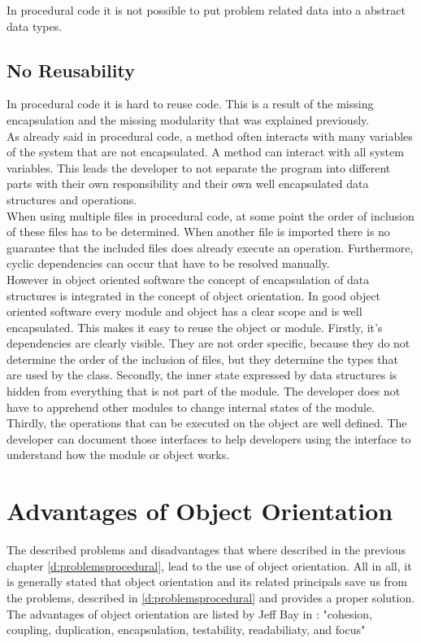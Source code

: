 In procedural code it is not possible to put problem related data into a abstract data types.

\subsection*{No Reusability}
In procedural code it is hard to reuse code. This is a result of the missing encapsulation and the missing modularity that was explained previously.\\

As already said in procedural code, a method often interacts with many variables of the system that are not encapsulated. A method can interact with all system variables. This leads the developer to not separate the program into different parts with their own responsibility and their own well encapsulated data structures and operations. \\

When using multiple files in procedural code, at some point the order of inclusion of these files has to be determined. When another file is imported there is no guarantee that the included files does already execute an operation. Furthermore, cyclic dependencies can occur that have to be resolved manually. \\

However in object oriented software the concept of encapsulation of data structures is integrated in the concept of object orientation.  In good object oriented software every module and object has a clear scope and is well encapsulated. This makes it easy to reuse the object or module. Firstly, it's dependencies are clearly visible. They are not order specific, because they do not determine the order of the inclusion of files, but they determine the types that are used by the class. Secondly, the inner state expressed by data structures is hidden from everything that is not part of the module. The developer does not have to apprehend other modules to change internal states of the module. Thirdly, the operations that can be executed on the object are well defined. The developer can document those interfaces to help developers using the interface to understand how the module or object works.

\section{Advantages of Object Orientation}
The described problems and disadvantages that where described in the previous chapter \ref{d:problemsprocedural}, lead to the use of object orientation. 
All in all, it is generally stated that object orientation and its related principals save us from the problems, described in \ref{d:problemsprocedural} and provides a proper solution. The advantages of object orientation are listed by Jeff Bay in \cite[p. 70]{oc2008}: "cohesion, coupling, duplication, encapsulation, testability, readabiliaty, and focus"\\

